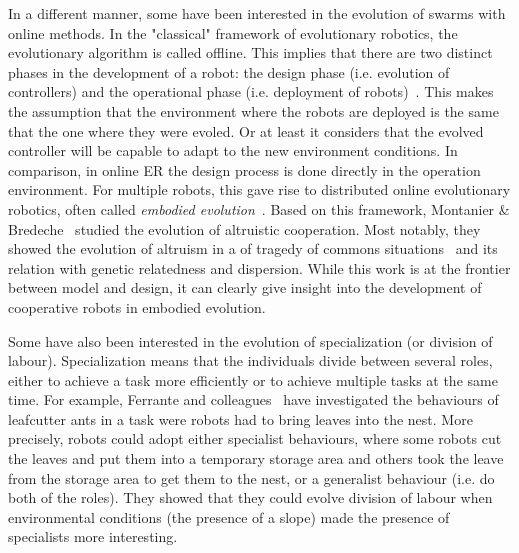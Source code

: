     In a different manner, some have been interested in the evolution of swarms with online methods. In the "classical" framework of evolutionary robotics, the evolutionary algorithm is called offline. This implies that there are two distinct phases in the development of a robot: the design phase (i.e. evolution of controllers) and the operational phase (i.e. deployment of robots)~\parencite{Doncieux2015a, Francesca2016}. This makes the assumption that the environment where the robots are deployed is the same that the one where they were evoled. Or at least it considers that the evolved controller will be capable to adapt to the new environment conditions. In comparison, in online ER the design process is done directly in the operation environment. For multiple robots, this gave rise to distributed online evolutionary robotics, often called \emph{embodied evolution}~\parencite{Ficici1999, Watson2002}. Based on this framework, Montanier \& Bredeche~\parencite{Montanier2011, Montanier2013} studied the evolution of altruistic cooperation. Most notably, they showed the evolution of altruism in a of tragedy of commons situations~\parencite{Hardin1968} and its relation with genetic relatedness and dispersion. While this work is at the frontier between model and design, it can clearly give insight into the development of cooperative robots in embodied evolution.


    Some have also been interested in the evolution of specialization (or division of labour). Specialization means that the individuals divide between several roles, either to achieve a task more efficiently or to achieve multiple tasks at the same time. For example, Ferrante and colleagues~\parencite{Ferrante2015} have investigated the behaviours of leafcutter ants in a task were robots had to bring leaves into the nest. More precisely, robots could adopt either specialist behaviours, where some robots cut the leaves and put them into a temporary storage area and others took the leave from the storage area to get them to the nest, or a generalist behaviour (i.e. do both of the roles). They showed that they could evolve division of labour when environmental conditions (the presence of a slope) made the presence of specialists more interesting.


